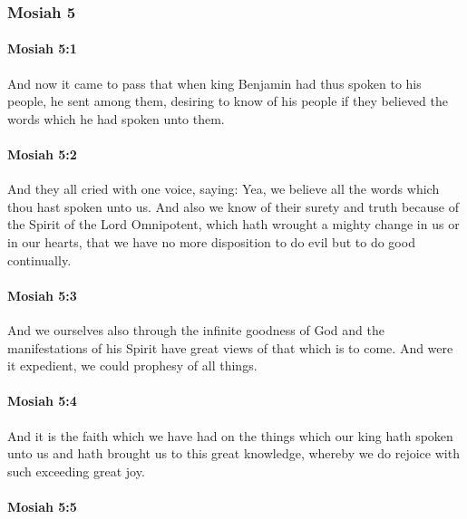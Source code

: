 	\subsubsection{Mosiah 5} %
		\label{MOSIAH-5}
					
		\paragraph{Mosiah 5:1} %
			\label{MOSIAH-5-1}

			And now it came to pass that
			when king Benjamin had thus spoken to his people,
			he sent among them, desiring to know of his people
			if they believed the words which he had spoken unto them.

		\paragraph{Mosiah 5:2} %
			\label{MOSIAH-5-2}

			And they all cried with one voice, saying:
			Yea, we believe all the words which thou hast spoken unto us.
			And also we know of their surety and truth
			because of the Spirit of the Lord Omnipotent,
			which hath wrought a mighty change in us or in our hearts,
			that we have no more disposition to do evil but to do good continually.

		\paragraph{Mosiah 5:3} %
			\label{MOSIAH-5-3}

			And we ourselves also through the infinite goodness of God
			and the manifestations of his Spirit
			have great views of that which is to come.
			And were it expedient, we could prophesy of all things.

		\paragraph{Mosiah 5:4} %
			\label{MOSIAH-5-4}

			And it is the faith which we have had on the things
			which our king hath spoken unto us
			and hath brought us to this great knowledge,
			whereby we do rejoice with such exceeding great joy.

		\paragraph{Mosiah 5:5} %
			\label{MOSIAH-5-5}

